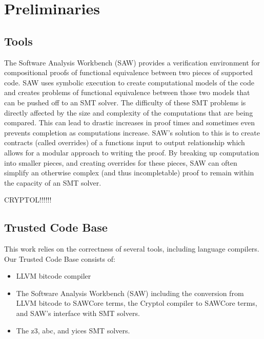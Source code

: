 \section{Preliminaries}\label{sec:preliminaries}


\subsection{Tools}
The Software Analysis Workbench (SAW) provides a verification environment for compositional proofs of functional equivalence between two pieces of supported code.  
SAW uses symbolic execution to create computational models of the code and creates problems of functional equivalence between those two models that can be pushed off to an SMT solver.  
The difficulty of these SMT problems is directly affected by the size and complexity of the computations that are being compared.  
This can lead to drastic increases in proof times and sometimes even prevents completion as computations increase.  
SAW’s solution to this is to create contracts (called overrides) of a functions input to output relationship which allows for a modular approach to writing the proof.  
By breaking up computation into smaller pieces, and creating overrides for these pieces, SAW can often simplify an otherwise complex (and thus incompletable) proof to remain within the capacity of an SMT solver.

CRYPTOL!!!!!!

\subsection{Trusted Code Base}
This work relies on the correctness of several tools, including language compilers.  
Our Trusted Code Base consists of:
\begin{itemize}
  \item LLVM bitcode compiler
  \item The Software Analysis Workbench (SAW) including the conversion from LLVM bitcode to SAWCore terms, the Cryptol compiler to SAWCore terms, and SAW's interface with SMT solvers.
  \item The z3, abc, and yices SMT solvers.
\end{itemize}